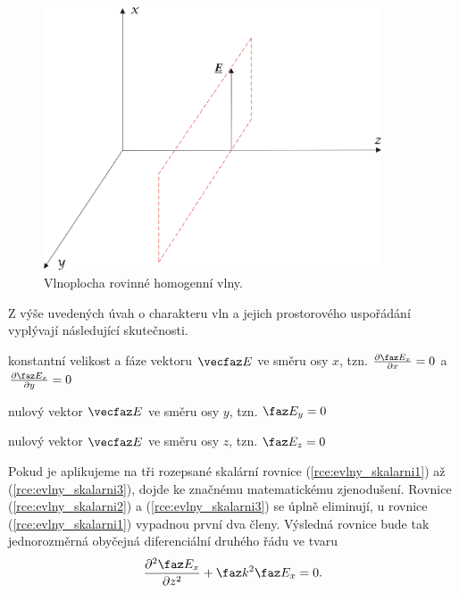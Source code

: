 \begin{figure}[!h]
	\centering
	\includegraphics[width=10cm]{evlny_vlnoplocha.png}
	\caption{Vlnoplocha rovinné homogenní vlny. \cite{emp}}
	\label{obr:evlny_vlnoplocha}
\end{figure}

Z výše uvedených úvah o charakteru vln a jejich prostorového uspořádání vyplývají následující skutečnosti.
\begin{itemize*}
\item konstantní velikost a fáze vektoru $\vecfaz E$ ve směru osy $x$, tzn. $\frac{\partial  \faz E_{x}}{\partial x}=0$ a $\frac{\partial \faz E_{x}}{\partial y}=0$
\item nulový vektor $\vecfaz E$ ve směru osy $y$, tzn. $ \faz E_{y} = 0$
\item nulový vektor $\vecfaz E$ ve směru osy $z$, tzn. $ \faz E_{z} = 0$
\end{itemize*}
Pokud je aplikujeme na tři rozepsané skalární rovnice (\ref{rce:evlny_skalarni1}) až (\ref{rce:evlny_skalarni3}), dojde ke značnému matematickému zjenodušení. Rovnice (\ref{rce:evlny_skalarni2}) a (\ref{rce:evlny_skalarni3}) se úplně eliminují, u rovnice (\ref{rce:evlny_skalarni1}) vypadnou první dva členy. Výsledná rovnice bude tak jednorozměrná obyčejná diferenciální druhého řádu ve tvaru
\begin{equation}
	\frac{\partial ^{2} \faz E_{x}}{\partial z^{2}} + \faz k^{2} \faz E_{x} = 0.
	\label{rce:evlny_skalarni}	
\end{equation}

